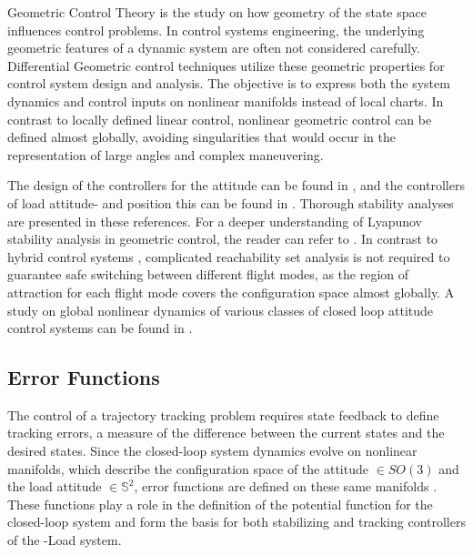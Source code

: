 Geometric Control Theory is the study on how geometry of the state space influences control problems. 
In control systems engineering, the underlying geometric features of a dynamic system are often not considered carefully. 
Differential Geometric control techniques utilize these geometric properties for control system design and analysis.
The objective is to express both the system dynamics and control inputs on nonlinear manifolds instead of local charts. 
In contrast to locally defined linear control, nonlinear geometric control can be defined almost globally, avoiding singularities that would occur in the representation of large angles and complex maneuvering.

The design of the controllers for the  attitude can be found in \cite{Lee2010}, and the controllers of load attitude- and position this can be found in \cite{Sreenath2013c}. Thorough stability analyses are presented in these references. For a deeper understanding of Lyapunov stability analysis in geometric control, the reader can refer to \cite{Bullo2005}.
In contrast to hybrid control systems \cite{Gillula2010}, complicated reachability set analysis is not required to guarantee safe switching between different flight modes, as the region of attraction for each flight mode covers the configuration space almost globally. A study on global nonlinear dynamics of various classes of closed loop attitude control systems can be found in \cite{Chaturvedi2011a}. 

\subsection{Error Functions}\label{sec:con.configerr}
The control of a trajectory tracking problem requires state feedback to define tracking errors, a measure of the difference between the current states and the desired states.
Since the closed-loop system dynamics evolve on nonlinear manifolds, which describe the configuration space of the  attitude $ \in SO(3) $ and the load attitude $ \in \mathbb{S}^2 $, 
error functions are defined on these same manifolds \cite{Bullo2005}. 
These functions play a role in the definition of the potential function for the closed-loop system and form the basis for both stabilizing and tracking controllers of the -Load system.
